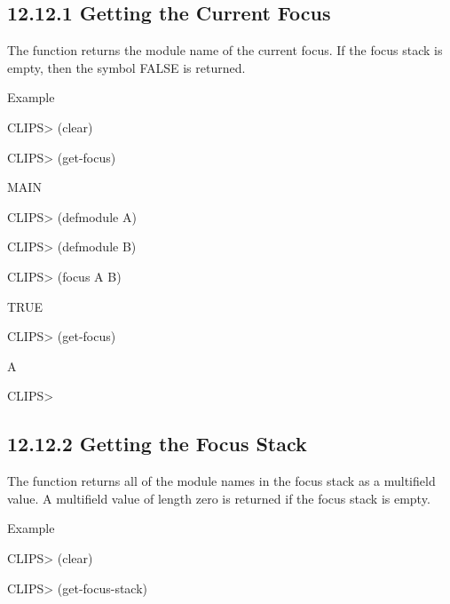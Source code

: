 \documentclass[letterpaper,10pt,english]{sphinxmanual}
\begin{document}
\subsection{12.12.1 Getting the Current Focus}
\label{\detokenize{actions:getting-the-current-focus}}
The function  returns the module name of the current focus.
If the focus stack is empty, then the symbol FALSE is returned.


\begin{sphinxVerbatim}[commandchars=\\\{\}]
\end{sphinxVerbatim}

Example

CLIPS\textgreater{} (clear)

CLIPS\textgreater{} (get-focus)

MAIN

CLIPS\textgreater{} (defmodule A)

CLIPS\textgreater{} (defmodule B)

CLIPS\textgreater{} (focus A B)

TRUE

CLIPS\textgreater{} (get-focus)

A

CLIPS\textgreater{}


\subsection{12.12.2 Getting the Focus Stack}
\label{\detokenize{actions:getting-the-focus-stack}}
The function  returns all of the module names in the
focus stack as a multifield value. A multifield value of length zero is
returned if the focus stack is empty.


\begin{sphinxVerbatim}[commandchars=\\\{\}]
\end{sphinxVerbatim}

Example

CLIPS\textgreater{} (clear)

CLIPS\textgreater{} (get-focus-stack)
\end{document}
